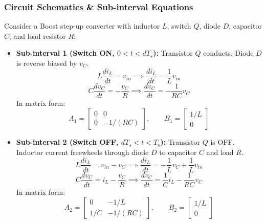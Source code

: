 \subsubsection{Circuit Schematics \& Sub-interval Equations}
Consider a Boost step-up converter with inductor $L$, switch $Q$, diode $D$, capacitor $C$, and load resistor $R$:
\begin{itemize}
  \item \textbf{Sub-interval 1 (Switch ON, $0 < t < d T_s$):}
  Transistor $Q$ conducts. Diode $D$ is reverse biased by $v_C$.
  \begin{equation}
  L \frac{di_L}{dt} = v_{in} \implies \frac{di_L}{dt} = \frac{1}{L} v_{in}
  \end{equation}
  \begin{equation}
  C \frac{dv_C}{dt} = -\frac{v_C}{R} \implies \frac{dv_C}{dt} = -\frac{1}{RC} v_C
  \end{equation}
  In matrix form:
  \begin{equation}
  A_1 = \begin{bmatrix} 0 & 0 \\ 0 & -1/(RC) \end{bmatrix}, \qquad B_1 = \begin{bmatrix} 1/L \\ 0 \end{bmatrix}
  \end{equation}

  \item \textbf{Sub-interval 2 (Switch OFF, $d T_s < t < T_s$):}
  Transistor $Q$ is OFF. Inductor current freewheels through diode $D$ to capacitor $C$ and load $R$.
  \begin{equation}
  L \frac{di_L}{dt} = v_{in} - v_C \implies \frac{di_L}{dt} = -\frac{1}{L} v_C + \frac{1}{L} v_{in}
  \end{equation}
  \begin{equation}
  C \frac{dv_C}{dt} = i_L - \frac{v_C}{R} \implies \frac{dv_C}{dt} = \frac{1}{C} i_L - \frac{1}{RC} v_C
  \end{equation}
  In matrix form:
  \begin{equation}
  A_2 = \begin{bmatrix} 0 & -1/L \\ 1/C & -1/(RC) \end{bmatrix}, \qquad B_2 = \begin{bmatrix} 1/L \\ 0 \end{bmatrix}
  \end{equation}
\end{itemize}

